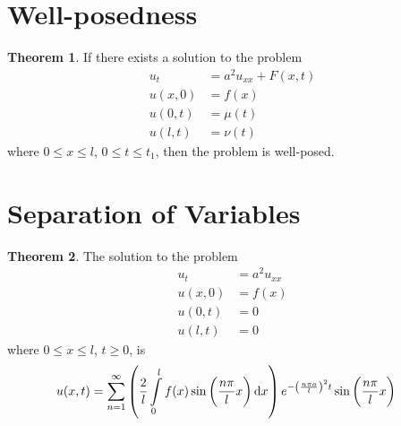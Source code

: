 \documentclass[titlepage, fleqn, a4paper, 12pt, twoside]{article}
\theoremstyle{definition}
\theoremstyle{theorem}
\newtheorem{theorem}{Theorem}
\begin{document}
\section{Well-posedness}

\begin{theorem}
	If there exists a solution to the problem
	\begin{align*}
		u_t    & = a^2 u_{x x} + F(x,t) \\
		u(x,0) & = f(x)                 \\
		u(0,t) & = \mu(t)               \\
		u(l,t) & = \nu(t)
	\end{align*}
	where $0 \le x \le l$, $0 \le t \le t_1$, then the problem is well-posed.
\end{theorem}

\section{Separation of Variables}

\begin{theorem}
	The solution to the problem
	\begin{align*}
		u_t    & = a^2 u_{x x} \\
		u(x,0) & = f(x)        \\
		u(0,t) & = 0           \\
		u(l,t) & = 0
	\end{align*}
	where $0 \le x \le l$, $t \ge 0$, is
	\begin{align*}
		u(x,t) & = \sum\limits_{n = 1}^{\infty} \left( \frac{2}{l} \int\limits_{0}^{l} f(x) \sin\left( \frac{n \pi}{l} x \right) \dif x \right) e^{-\left( \frac{n \pi a}{l} \right)^2 t} \sin\left( \frac{n \pi}{l} x \right)
	\end{align*}
\end{theorem}
\end{document}
